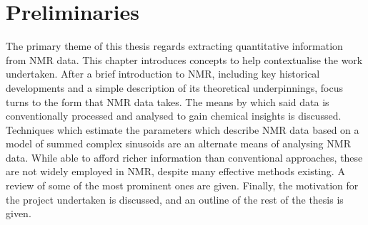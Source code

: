 \chapter{Preliminaries}
\label{chap:intro}
The primary theme of this thesis regards extracting quantitative information
from \ac{NMR} data. This chapter introduces concepts to help contextualise the
work undertaken.
After a brief introduction to \ac{NMR}, including key historical developments
and a simple description of its theoretical underpinnings, focus turns to
the form that \ac{NMR} data takes. The means by which said data is
conventionally processed and analysed to gain chemical insights is discussed.
Techniques which estimate the parameters which describe \ac{NMR} data based on
a model of summed complex sinusoids are an alternate means of analysing
\ac{NMR} data. While able to afford richer information than conventional
approaches, these are not widely employed in \ac{NMR}, despite many effective
methods existing. A review of some of the most prominent ones are given.
Finally, the motivation for the project undertaken is discussed, and an outline of
the rest of the thesis is given.




